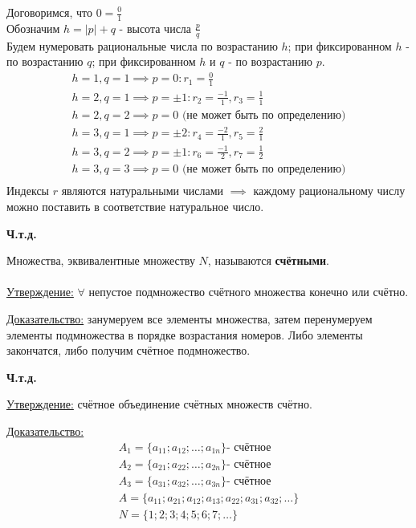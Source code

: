 \documentclass[12pt]{article}
\begin{document}
        \begin{adjustwidth}{1.5em}{1.5em}
        Договоримся, что $0 = \frac{0}{1}$\\
        Обозначим $h = |p| + q$ - высота числа $\frac{p}{q}$\\
        Будем нумеровать рациональные числа по возрастанию $h$; при фиксированном $h$ - по возрастанию $q$; при фиксированном $h$ и $q$ - по возрастанию $p$.\\
        \begin{gather*}
            h = 1, q = 1 \implies p = 0 : r_{1} = \frac{0}{1}\\
            h = 2, q = 1 \implies p = \pm 1 : r_{2} = \frac{-1}{1}, r_{3} = \frac{1}{1}\\
            h = 2, q = 2 \implies p = 0 \text{ (не может быть по определению)}\\
            h = 3, q = 1 \implies p = \pm 2 : r_{4} = \frac{-2}{1}, r_{5} = \frac{2}{1}\\
            h = 3, q = 2 \implies p = \pm 1 : r_{6} = \frac{-1}{2}, r_{7} = \frac{1}{2}\\
            h = 3, q = 3 \implies p = 0 \text{ (не может быть по определению)}\\
        \end{gather*}
        Индексы $r$ являются натуральными числами $\implies$ каждому рациональному числу можно поставить в соответствие натуральное число.
        \end{adjustwidth}
    \begin{center}
        \textbf{Ч.т.д.}
    \end{center}
    Множества, эквивалентные множеству $N$, называются \textbf{счётными}.\\\\
    \underline{Утверждение:} $\forall$ непустое подмножество счётного множества конечно или счётно.\par\noindent
    \underline{Доказательство:} занумеруем все элементы множества, затем перенумеруем элементы подмножества в порядке возрастания номеров. Либо элементы закончатся, либо получим счётное подмножество.
    \begin{center}
        \textbf{Ч.т.д.}
    \end{center}
    \par
    \noindent \underline{Утверждение:} счётное объединение счётных множеств счётно.\par\noindent
    \underline{Доказательство:}
    \begin{gather*}
        A_{1} = \{a_{11}; a_{12}; \dots; a_{1n}\} \text{- счётное}\\
        A_{2} = \{a_{21}; a_{22}; \dots; a_{2n}\} \text{- счётное}\\
        A_{3} = \{a_{31}; a_{32}; \dots; a_{3n}\} \text{- счётное}\\
        A = \{a_{11}; a_{21}; a_{12}; a_{13}; a_{22}; a_{31}; a_{32}; \dots\}\\
        N = \{1; 2; 3; 4; 5; 6; 7; \dots\}
    \end{gather*}
\end{document}
